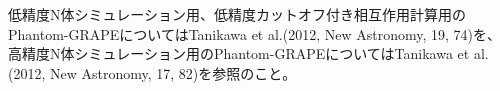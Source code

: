 低精度N体シミュレーション用、低精度カットオフ付き相互作用計算用の
Phantom-GRAPEについてはTanikawa et al.(2012, New Astronomy, 19, 74)を、
高精度N体シミュレーション用のPhantom-GRAPEについてはTanikawa et
al.(2012, New Astronomy, 17, 82)を参照のこと。
